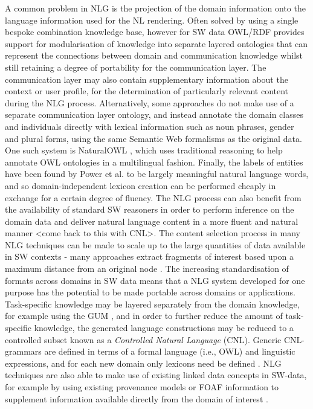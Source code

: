 \documentclass{acm_proc_article-sp}
\begin{document}
A common problem in NLG is the projection of the domain information onto the language information used for the NL rendering. Often solved by using a single bespoke combination knowledge base, however for SW data OWL/RDF provides support for modularisation of knowledge into separate layered ontologies that can represent the connections between domain and communication knowledge whilst still retaining a degree of portability for the communication layer. The communication layer may also contain supplementary information about the context or user profile, for the determination of particularly relevant content during the NLG process.
Alternatively, some approaches do not make use of a separate communication layer ontology, and instead annotate the domain classes and individuals directly with lexical information such as noun phrases, gender and plural forms, using the same Semantic Web formalisms as the original data. One such system is NaturalOWL \cite{56}, which uses traditional reasoning to help annotate OWL ontologies in a multilingual fashion.
Finally, the labels of entities have been found by Power et al. \cite{105} to be largely meaningful natural language words, and so domain-independent lexicon creation can be performed cheaply in exchange for a certain degree of fluency.
The NLG process can also benefit from the availability of standard SW reasoners in order to perform inference on the domain data and deliver natural language content in a more fluent and natural manner <come back to this with CNL>.
The content selection process in many NLG techniques can be made to scale up to the large quantities of data available in SW contexts - many approaches extract fragments of interest based upon a maximum distance from an original node \cite{35}. The increasing standardisation of formats across domains in SW data means that a NLG system developed for one purpose has the potential to be made portable across domains or applications. Task-specific knowledge may be layered separately from the domain knowledge, for example using the GUM \cite{10}, and in order to further reduce the amount of task-specific knowledge, the generated language constructions may be reduced to a controlled subset known as a \textit{Controlled Natural Language} (CNL). Generic CNL-grammars are defined in terms of a formal language (i.e., OWL) and linguistic expressions, and for each new domain only lexicons need be defined \cite{105}. NLG techniques are also able to make use of existing linked data concepts in SW-data, for example by using existing provenance models or FOAF information to supplement information available directly from the domain of interest \cite{18}.
\end{document}
